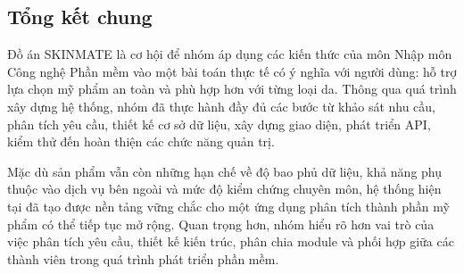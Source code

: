 \documentclass[12pt,a4paper]{article}
\begin{document}
\subsection{Tổng kết chung}

Đồ án SKINMATE là cơ hội để nhóm áp dụng các kiến thức của môn Nhập môn Công nghệ Phần mềm vào một bài toán thực tế có ý nghĩa với người dùng: hỗ trợ lựa chọn mỹ phẩm an toàn và phù hợp hơn với từng loại da. Thông qua quá trình xây dựng hệ thống, nhóm đã thực hành đầy đủ các bước từ khảo sát nhu cầu, phân tích yêu cầu, thiết kế cơ sở dữ liệu, xây dựng giao diện, phát triển API, kiểm thử đến hoàn thiện các chức năng quản trị.

Mặc dù sản phẩm vẫn còn những hạn chế về độ bao phủ dữ liệu, khả năng phụ thuộc vào dịch vụ bên ngoài và mức độ kiểm chứng chuyên môn, hệ thống hiện tại đã tạo được nền tảng vững chắc cho một ứng dụng phân tích thành phần mỹ phẩm có thể tiếp tục mở rộng. Quan trọng hơn, nhóm hiểu rõ hơn vai trò của việc phân tích yêu cầu, thiết kế kiến trúc, phân chia module và phối hợp giữa các thành viên trong quá trình phát triển phần mềm.
\end{document}
